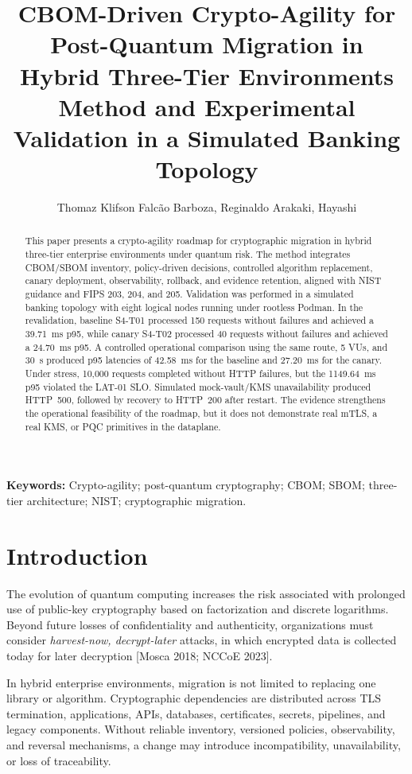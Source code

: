 \documentclass[12pt]{article}
\title{CBOM-Driven Crypto-Agility for Post-Quantum Migration in Hybrid Three-Tier Environments\\
Method and Experimental Validation in a Simulated Banking Topology}
\author{Thomaz Klifson Falc\~ao Barboza\inst{1}, Reginaldo Arakaki\inst{1}, Hayashi\inst{1}}
\newcommand{\sbcshortcite}[2]{[#1]\nocite{#2}}
\begin{document}
\maketitle

\begin{abstract}
This paper presents a crypto-agility roadmap for cryptographic migration in hybrid three-tier enterprise environments under quantum risk. The method integrates CBOM/SBOM inventory, policy-driven decisions, controlled algorithm replacement, canary deployment, observability, rollback, and evidence retention, aligned with NIST guidance and FIPS 203, 204, and 205. Validation was performed in a simulated banking topology with eight logical nodes running under rootless Podman. In the revalidation, baseline S4-T01 processed 150 requests without failures and achieved a 39.71~ms p95, while canary S4-T02 processed 40 requests without failures and achieved a 24.70~ms p95. A controlled operational comparison using the same route, 5 VUs, and 30~s produced p95 latencies of 42.58~ms for the baseline and 27.20~ms for the canary. Under stress, 10,000 requests completed without HTTP failures, but the 1149.64~ms p95 violated the LAT-01 SLO. Simulated mock-vault/KMS unavailability produced HTTP~500, followed by recovery to HTTP~200 after restart. The evidence strengthens the operational feasibility of the roadmap, but it does not demonstrate real mTLS, a real KMS, or PQC primitives in the dataplane.
\end{abstract}

\noindent\textbf{Keywords:} Crypto-agility; post-quantum cryptography; CBOM; SBOM; three-tier architecture; NIST; cryptographic migration.

\section{Introduction}
The evolution of quantum computing increases the risk associated with prolonged use of public-key cryptography based on factorization and discrete logarithms. Beyond future losses of confidentiality and authenticity, organizations must consider \textit{harvest-now, decrypt-later} attacks, in which encrypted data is collected today for later decryption \sbcshortcite{Mosca 2018; NCCoE 2023}{mosca2018,nist1800b}.

In hybrid enterprise environments, migration is not limited to replacing one library or algorithm. Cryptographic dependencies are distributed across TLS termination, applications, APIs, databases, certificates, secrets, pipelines, and legacy components. Without reliable inventory, versioned policies, observability, and reversal mechanisms, a change may introduce incompatibility, unavailability, or loss of traceability.
\end{document}
